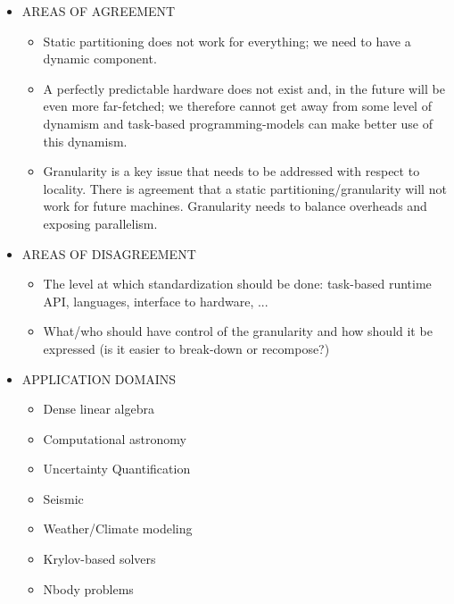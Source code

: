 \begin{itemize}
			
			
	\item AREAS OF AGREEMENT
		  \begin{itemize}
		  \item Static partitioning does not work for everything; we need to
		      have a dynamic component.
		  \item A perfectly predictable hardware does not exist and, in the
		      future will be even more far-fetched; we therefore cannot get
		      away from some level of dynamism and task-based
		      programming-models can make better use of this dynamism.
		  \item Granularity is a key issue that needs to be addressed with
		      respect to locality. There is agreement that a static
		      partitioning/granularity will not work for future
		      machines. Granularity needs to balance overheads and exposing
		      parallelism.
		  \end{itemize}
	
	
	
	\item AREAS OF DISAGREEMENT
		  \begin{itemize}
		  \item The level at which standardization should be done: task-based
		      runtime API, languages, interface to hardware, ...
		  \item What/who should have control of the granularity and how should
		      it be expressed (is it easier to break-down or recompose?)
		  \end{itemize}



	\item APPLICATION DOMAINS
		\begin{itemize}
			\item Dense linear algebra
			\item Computational astronomy
			\item Uncertainty Quantification
			\item Seismic
			\item Weather/Climate modeling
			\item Krylov-based solvers
			\item Nbody problems
		\end{itemize}

\end{itemize}


